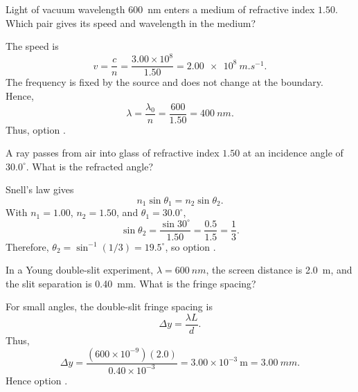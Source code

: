 \begin{quizquestion}[
  id=phy104-opt-016,
  topic=optics,
  difficulty=foundation,
  marks=1,
  correct=A,
  tags={refraction,refractive-index,wavelength},
  outcome={Determine wave speed and wavelength in a refracting medium}
]
  Light of vacuum wavelength \SI{600}{nm} enters a medium of refractive index \(1.50\). Which pair gives its speed and wavelength in the medium?
\end{quizquestion}
\begin{quizsolution}
  The speed is
    \[
      v=\frac{c}{n}=\frac{3.00\times10^8}{1.50}=\SI{2.00e8}{m.s^{-1}}.
    \]
    The frequency is fixed by the source and does not change at the boundary. Hence,
    \[
      \lambda=\frac{\lambda_0}{n}=\frac{600}{1.50}=\SI{400}{nm}.
    \]
    Thus, option \textbf{\quizcorrectletter}.
\end{quizsolution}

\begin{quizquestion}[
  id=phy104-opt-017,
  topic=optics,
  difficulty=foundation,
  marks=1,
  correct=D,
  tags={refraction,snells-law,angle},
  outcome={Apply Snell's law to determine a refraction angle}
]
  A ray passes from air into glass of refractive index \(1.50\) at an incidence angle of \(30.0^\circ\). What is the refracted angle?
\end{quizquestion}
\begin{quizsolution}
  Snell's law gives
    \[
      n_1\sin\theta_1=n_2\sin\theta_2.
    \]
    With \(n_1=1.00\), \(n_2=1.50\), and \(\theta_1=30.0^\circ\),
    \[
      \sin\theta_2=\frac{\sin30^\circ}{1.50}=\frac{0.5}{1.5}=\frac13.
    \]
    Therefore, \(\theta_2=\sin^{-1}(1/3)=19.5^\circ\), so option \textbf{\quizcorrectletter}.
\end{quizsolution}

\begin{quizquestion}[
  id=phy104-opt-018,
  topic=optics,
  difficulty=foundation,
  marks=1,
  correct=B,
  tags={double-slit,fringe-spacing,interference},
  outcome={Calculate Young double-slit fringe spacing}
]
  In a Young double-slit experiment, \(\lambda=\SI{600}{nm}\), the screen distance is \SI{2.0}{m}, and the slit separation is \SI{0.40}{mm}. What is the fringe spacing?
\end{quizquestion}
\begin{quizsolution}
  For small angles, the double-slit fringe spacing is
    \[
      \Delta y=\frac{\lambda L}{d}.
    \]
    Thus,
    \[
      \Delta y=\frac{(600\times10^{-9})(2.0)}{0.40\times10^{-3}}
      =3.00\times10^{-3}\ \mathrm{m}
      =\SI{3.00}{mm}.
    \]
    Hence option \textbf{\quizcorrectletter}.
\end{quizsolution}

